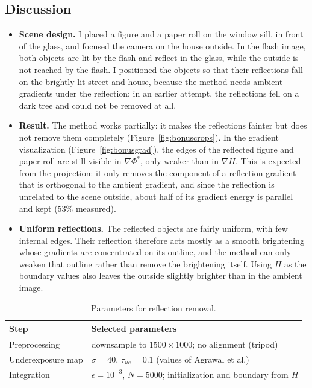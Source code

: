 \documentclass[11pt]{article}
\begin{document}
\subsection*{Discussion}
\begin{itemize}\setlength{\itemsep}{2pt}
\item \textbf{Scene design.} I placed a figure and a paper roll on the window sill, in front of the glass, and focused the camera on the house outside. In the flash image, both objects are lit by the flash and reflect in the glass, while the outside is not reached by the flash. I positioned the objects so that their reflections fall on the brightly lit street and house, because the method needs ambient gradients under the reflection: in an earlier attempt, the reflections fell on a dark tree and could not be removed at all.

\item \textbf{Result.} The method works partially: it makes the reflections fainter but does not remove them completely (Figure~\ref{fig:bonuscrops}). In the gradient visualization (Figure~\ref{fig:bonusgrad}), the edges of the reflected figure and paper roll are still visible in $\nabla\Phi^*$, only weaker than in $\nabla H$. This is expected from the projection: it only removes the component of a reflection gradient that is orthogonal to the ambient gradient, and since the reflection is unrelated to the scene outside, about half of its gradient energy is parallel and kept (53\% measured).

\item \textbf{Uniform reflections.} The reflected objects are fairly uniform, with few internal edges. Their reflection therefore acts mostly as a smooth brightening whose gradients are concentrated on its outline, and the method can only weaken that outline rather than remove the brightening itself. Using $H$ as the boundary values also leaves the outside slightly brighter than in the ambient image.
\end{itemize}

\begin{table}[!htbp]
\centering
\small
\begin{tabular}{ll}
\toprule
Step & Selected parameters \\
\midrule
Preprocessing & downsample to $1500\times1000$; no alignment (tripod) \\
Underexposure map & $\sigma=40$, $\tau_{ue}=0.1$ (values of Agrawal et al.) \\
Integration & $\epsilon=10^{-3}$, $N=5000$; initialization and boundary from $H$ \\
\bottomrule
\end{tabular}
\caption{Parameters for reflection removal.}
\label{tab:bonusparams}
\end{table}
\end{document}
